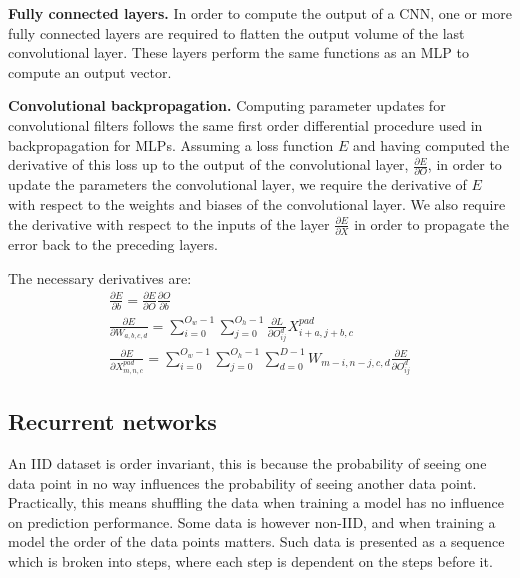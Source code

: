 \noindent \textbf{Fully connected layers.} In order to compute the output of a CNN, one or more fully connected layers are required to flatten the output volume of the last convolutional layer. These layers perform the same functions as an MLP to compute an output vector. \par

\noindent \textbf{Convolutional backpropagation.} Computing parameter updates for convolutional filters follows the same first order differential procedure used in backpropagation for MLPs. Assuming a loss function $ E $ and having computed the derivative of this loss up to the output of the convolutional layer, $ \frac{\partial E} {\partial O} $, in order to update the parameters the convolutional layer, we require the derivative of $ E $ with respect to the weights and biases of the convolutional layer. We also require the derivative with respect to the inputs of the layer $\frac{\partial E} {\partial X}$ in order to propagate the error back to the preceding layers. \par

\noindent The necessary derivatives are:
\unskip
\begin{subequations}
	\begin{gather}
		\frac{\partial E} {\partial b} = \frac{\partial E} {\partial O}\frac{\partial O} {\partial b} \\
		\frac{\partial E} {\partial W_{a,b,c,d}} = \sum_{i=0}^{O_w - 1}\sum_{j=0}^{O_h - 1}\frac{\partial L} {\partial O_{ij}^{d}}X_{i+a,j+b,c}^{pad} \\
		\frac{\partial E} {\partial X_{m,n,c}^{pad}} = \sum_{i=0}^{O_w - 1}\sum_{j=0}^{O_h - 1}\sum_{d=0}^{D - 1}W_{m-i,n-j,c,d}\frac{\partial E} {\partial O_{ij}^{d}}
	\end{gather}
\end{subequations}


\subsection{Recurrent networks}

An IID dataset is order invariant, this is because the probability of seeing one data point in no way influences the probability of seeing another data point. Practically, this means shuffling the data when training a model has no influence on prediction performance. Some data is however non-IID, and when training a model the order of the data points matters. Such data is presented as a sequence which is broken into steps, where each step is dependent on the steps before it. \par


